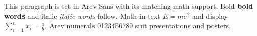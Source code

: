 \documentclass{article}
\begin{document}
This paragraph is set in Arev Sans with its matching math support.
Bold \textbf{bold words} and italic \textit{italic words} follow.
Math in text $E = mc^2$ and display $\sum_{i=1}^{n} x_i = \frac{a}{b}$.
Arev numerals 0123456789 suit presentations and posters.
\end{document}
